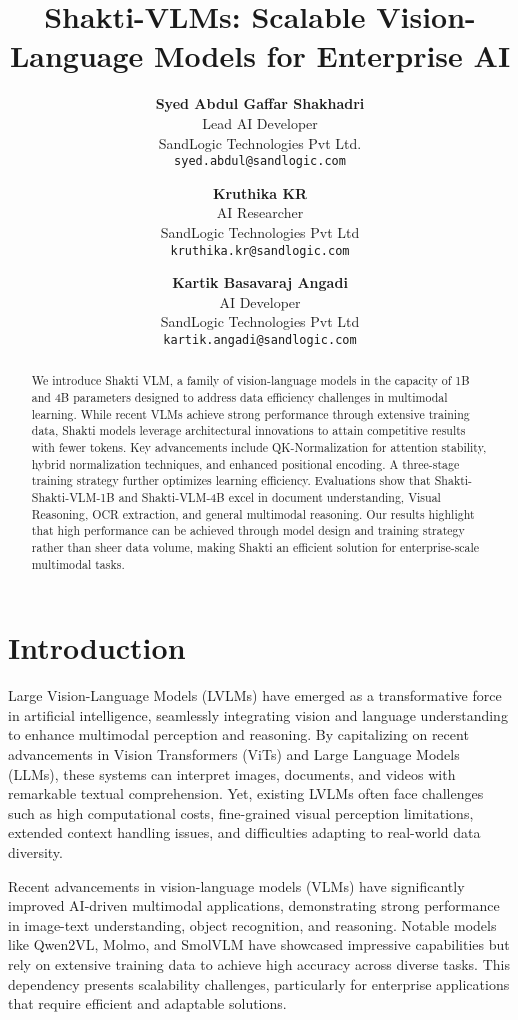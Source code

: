 \documentclass{article}
\title{\textnormal{Shakti-VLMs: Scalable Vision-Language Models for Enterprise AI}}
\author{%
    \textbf{Syed Abdul Gaffar Shakhadri}\\
    \small{Lead AI Developer}\\
    \small{SandLogic Technologies Pvt Ltd.}\\
    \small{\texttt{syed.abdul@sandlogic.com}}
    \and
    \textbf{Kruthika KR}\\
    \small{AI Researcher}\\
    \small{SandLogic Technologies Pvt Ltd}\\
    \small{\texttt{kruthika.kr@sandlogic.com}}
    \and
    \textbf{Kartik Basavaraj Angadi}\\
    \small{AI Developer}\\
    \small{SandLogic Technologies Pvt Ltd}\\
    \small{\texttt{kartik.angadi@sandlogic.com}}
}
\begin{document}
\maketitle

\begin{abstract}
We introduce Shakti VLM, a family of vision-language models in the capacity of 1B and 4B parameters designed to address data efficiency challenges in multimodal learning. While recent VLMs achieve strong performance through extensive training data, Shakti models leverage architectural innovations to attain competitive results with fewer tokens. Key advancements include QK-Normalization for attention stability, hybrid normalization techniques, and enhanced positional encoding. A three-stage training strategy further optimizes learning efficiency. Evaluations show that Shakti-Shakti-VLM-1B and Shakti-VLM-4B excel in document understanding, Visual Reasoning, OCR extraction, and general multimodal reasoning. Our results highlight that high performance can be achieved through model design and training strategy rather than sheer data volume, making Shakti an efficient solution for enterprise-scale multimodal tasks.
\end{abstract}





\section{Introduction}
Large Vision-Language Models (LVLMs) have emerged as a transformative force in artificial intelligence, seamlessly integrating vision and language understanding to enhance multimodal perception and reasoning. By capitalizing on recent advancements in Vision Transformers (ViTs)\cite{dosovitskiy2021imageworth16x16wordsvit} and Large Language Models (LLMs), these systems can interpret images, documents, and videos with remarkable textual comprehension. Yet, existing LVLMs often face challenges such as high computational costs, fine-grained visual perception limitations, extended context handling issues, and difficulties adapting to real-world data diversity.

Recent advancements in vision-language models (VLMs) have significantly improved AI-driven multimodal applications, demonstrating strong performance in image-text understanding, object recognition, and reasoning. Notable models like Qwen2VL\cite{wang2024qwen2vlenhancingvisionlanguagemodels}, Molmo\cite{deitke2024molmopixmoopenweights}, and SmolVLM\cite{smolvlm} have showcased impressive capabilities but rely on extensive training data to achieve high accuracy across diverse tasks. This dependency presents scalability challenges, particularly for enterprise applications that require efficient and adaptable solutions.
\end{document}

